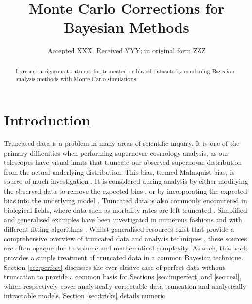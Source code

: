 \documentclass[a4paper,fleqn,usenatbib]{mnras}
\title[MC Corrections for Bayesian Methods]{Monte Carlo Corrections for Bayesian Methods}
\author[S. R. Hinton et al.]{Samuel R. Hinton,$^{1,2}$\thanks{E-mail: \href{samuelreay@gmail.com}}
\\
$^{1}$School of Mathematics and Physics, The University of Queensland, Brisbane, QLD 4072, Australia\\
$^{2}$ARC Centre of Excellence for All-sky Astrophysics (CAASTRO)
}
\date{Accepted XXX. Received YYY; in original form ZZZ}
\begin{document}
\label{firstpage}
\pagerange{\pageref{firstpage}--\pageref{lastpage}}
\maketitle



\begin{abstract}
I present a rigorous treatment for truncated or biased datasets by combining Bayesian analysis methods with Monte Carlo simulations.
\end{abstract}



\section{Introduction}

Truncated data is a problem in many areas of scientific inquiry. It is one of the primary difficulties when performing supernovae cosmology analysis, as our telescopes have visual limits that truncate our observed supernovae distribution from the actual underlying distribution. This bias, termed Malmquist bias, is source of much investigation \citep{Butkevich2005}. It is considered during analysis by either modifying the observed data to remove the expected bias \citep{BetouleKessler2014, ConleyGuySullivan2011}, or by incorporating the expected bias into the underlying model \citep{Rubin2015}. Truncated data is also commonly encountered in biological fields, where data such as mortality rates are left-truncated \citep{JANE1898}. Simplified and generalised examples have been investigated in numerous fashions \citep{woodroofe1985estimating, Gull1989bayesian, grogger1991models, o1995truncated} and with different fitting algorithms \citep{Gelfand1992}. Whilst generalised resources exist that provide a comprehensive overview of truncated data and analysis techniques \citep{klein2005survival}, these sources are often opaque due to volume and mathematical complexity. As such, this work provides a simple treatment of truncated data in a common Bayesian technique. Section \ref{sec:perfect} discusses the ever-elusive case of perfect data without truncation to provide a common basis for Sections \ref{sec:imperfect} and \ref{sec:real}, which respectively cover analytically correctable data truncation and analytically intractable models. Section \ref{sec:tricks} details numeric 
\end{document}
